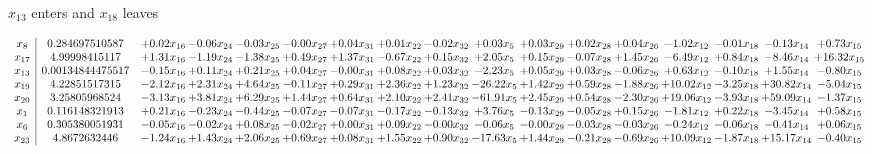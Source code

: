 \documentclass[9pt]{article}
\begin{document}
 $ x_{13} $ enters and $ x_{18} $ leaves 

 \[\begin{array}{c| c c@{\hskip 2pt} c@{\hskip 2pt} c@{\hskip 2pt} c@{\hskip 2pt} c@{\hskip 2pt} c@{\hskip 2pt} c@{\hskip 2pt} c@{\hskip 2pt} c@{\hskip 2pt} c@{\hskip 2pt} c@{\hskip 2pt} c@{\hskip 2pt} c@{\hskip 2pt} c@{\hskip 2pt} c@{\hskip 2pt} }
 x_{8}   &  0.284697510587 & +  0.02 x_{16} & -0.06 x_{24} & -0.03 x_{25} & -0.00 x_{27} & +  0.04 x_{31} & +  0.01 x_{22} & -0.02 x_{32} & +  0.03 x_{5} & +  0.03 x_{29} & +  0.02 x_{28} & +  0.04 x_{26} & -1.02 x_{12} & -0.01 x_{18} & -0.13 x_{14} & +  0.73 x_{15}\\
 x_{17}   &  4.99998415117 & +  1.31 x_{16} & -1.19 x_{24} & -1.38 x_{25} & +  0.49 x_{27} & +  1.37 x_{31} & -0.67 x_{22} & +  0.15 x_{32} & +  2.05 x_{5} & +  0.15 x_{29} & -0.07 x_{28} & +  1.45 x_{26} & -6.49 x_{12} & +  0.84 x_{18} & -8.46 x_{14} & + 16.32 x_{15}\\
 x_{13}   &  0.00134844475517 & -0.15 x_{16} & +  0.11 x_{24} & +  0.21 x_{25} & +  0.04 x_{27} & -0.00 x_{31} & +  0.08 x_{22} & +  0.03 x_{32} & -2.23 x_{5} & +  0.05 x_{29} & +  0.03 x_{28} & -0.06 x_{26} & +  0.63 x_{12} & -0.10 x_{18} & +  1.55 x_{14} & -0.80 x_{15}\\
 x_{19}   &  4.22851517315 & -2.12 x_{16} & +  2.31 x_{24} & +  4.64 x_{25} & -0.11 x_{27} & +  0.29 x_{31} & +  2.36 x_{22} & +  1.23 x_{32} & -26.22 x_{5} & +  1.42 x_{29} & +  0.59 x_{28} & -1.88 x_{26} & + 10.02 x_{12} & -3.25 x_{18} & + 30.82 x_{14} & -5.04 x_{15}\\
 x_{20}   &  3.25805968524 & -3.13 x_{16} & +  3.81 x_{24} & +  6.29 x_{25} & +  1.44 x_{27} & +  0.64 x_{31} & +  2.10 x_{22} & +  2.41 x_{32} & -61.91 x_{5} & +  2.45 x_{29} & +  0.54 x_{28} & -2.30 x_{26} & + 19.06 x_{12} & -3.93 x_{18} & + 59.09 x_{14} & -1.37 x_{15}\\
 x_{1}   &  0.116148321913 & +  0.21 x_{16} & -0.23 x_{24} & -0.44 x_{25} & -0.07 x_{27} & -0.07 x_{31} & -0.17 x_{22} & -0.13 x_{32} & +  3.76 x_{5} & -0.13 x_{29} & -0.05 x_{28} & +  0.15 x_{26} & -1.81 x_{12} & +  0.22 x_{18} & -3.45 x_{14} & +  0.58 x_{15}\\
 x_{6}   &  0.305380051931 & -0.05 x_{16} & -0.02 x_{24} & +  0.08 x_{25} & -0.02 x_{27} & +  0.00 x_{31} & +  0.09 x_{22} & -0.00 x_{32} & -0.06 x_{5} & -0.00 x_{29} & -0.03 x_{28} & -0.03 x_{26} & -0.24 x_{12} & -0.06 x_{18} & -0.41 x_{14} & +  0.06 x_{15}\\
 x_{23}   &  4.8672632446 & -1.24 x_{16} & +  1.43 x_{24} & +  2.06 x_{25} & +  0.69 x_{27} & +  0.08 x_{31} & +  1.55 x_{22} & +  0.90 x_{32} & -17.63 x_{5} & +  1.44 x_{29} & -0.21 x_{28} & -0.69 x_{26} & + 10.09 x_{12} & -1.87 x_{18} & + 15.17 x_{14} & -0.40 x_{15}\\

\end{array}\]
\end{document}
